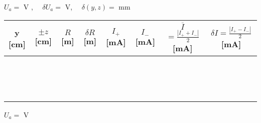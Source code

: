 \documentclass[a4paper,12pt]{article}  %
\begin{document}
\begin{center}
	\noindent	$U_a =$ \underline{\makebox[1.5cm][r]{~}} V ,  $\quad \delta U_a=$	\underline{\makebox[1cm][r]{~}} V, $\quad \delta (y,z)=$ \underline{\makebox[1cm][r]{~}} mm  \\

	\renewcommand{\arraystretch}{0.75}
	
\bigskip


	\begin{tabular}{|c|c|c|c|c|c|c|c|}
	\hline
	y [cm]  & $\pm z$ [cm]  & $R$ [m] & $\delta R$ [m] & $I_+$ [mA] & $I_-$ [mA] & $\overline{I}$   {\tiny $ = \frac{| I_+ + I_-|}{2}$ [mA] } & {\tiny $\delta I = \frac{| I_+ - I_-|}{2}$ [mA] } \\
	\hline
	 &  &  &  & &  &  & \\ \cline{5-8}
	 &  &  &  & &  & & \\ \cline{5-8}
	 &  &  &  & &  & & \\ \cline{5-8}
	 \hline
	 &  &  &  & &  & & \\ \cline{5-8}
	 &  &  &  & &  & & \\ \cline{5-8}
	 &  &  &  & &  & & \\ \cline{5-8}
	 \hline
	 &  &  &  & &  & & \\ \cline{5-8}
	 &  &  &  & &  & & \\ \cline{5-8}
	 &  &  &  & &  & & \\ \cline{5-8}
	 \hline
	 &  &  &  & &  & & \\ \cline{5-8}
	 &  &  &  & &  & & \\ \cline{5-8}
	 &  &  &  & &  & & \\ \cline{5-8}
	 \hline
	 &  &  &  & &  & & \\ \cline{5-8}
	 &  &  &  & &  & & \\ \cline{5-8}
	 &  &  &  & &  & & \\ \cline{5-8}
	 \hline
 	\end{tabular}

	\bigskip
		
	\noindent	$U_a =$ \underline{\makebox[1.5cm][r]{~}}  V  %

	\bigskip


\end{center}
\end{document}

